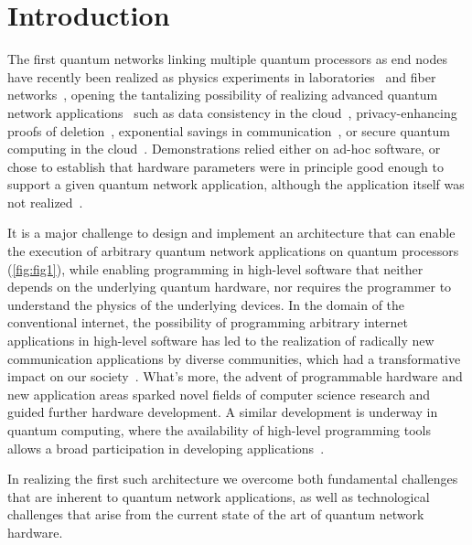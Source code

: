 \section{Introduction}

The first quantum networks linking multiple quantum processors as end nodes have recently been realized as physics experiments in laboratories~\cite{moehring_2007_ion_traps,ritter_2012_elementary,hofmann_2012_heralded,stockill_2017_phasetuned,jing2019entanglement,stephenson_2020_highrate,pompili_2021_multinode,krutyanskiy_entanglement_2023} and fiber networks~\cite{liu2024creation,stolk2024metropolitan,knaut2024entanglement}, opening the tantalizing possibility of realizing advanced quantum network applications~\cite{wehner_2018_stages} such as data consistency in the cloud~\cite{benor_2005_byzantine}, privacy-enhancing proofs of deletion~\cite{poremba_quantum_2022}, exponential savings in communication~\cite{guerin_exponential_2016}, or secure quantum computing in the cloud~\cite{broadbent_2009_ubqc,childs_2005_secure_qc}. Demonstrations relied either on ad-hoc software, or chose to establish that hardware parameters were in principle good enough to support a given quantum network application, although the application itself was not realized~\cite{nadlinger_device-independent_2022,liu_2022_photonic_diqkd,zhang_2022_diqkd}.

It is a major challenge to design and implement an architecture that can enable the execution of arbitrary quantum network applications on quantum processors (\cref{fig:fig1}), while enabling programming in high-level software that neither depends on the underlying quantum hardware, nor requires the programmer to understand the physics of the underlying devices.  In the domain of the conventional internet, the possibility of programming arbitrary internet applications in high-level software has led to the realization of radically new communication applications by diverse communities, which had a transformative impact on our society~\cite{castells_impact_2013}. What's more, the advent of programmable hardware and new application areas sparked novel fields of computer science research and guided further hardware development.  A similar development is underway in quantum computing, where the availability of high-level programming tools allows a broad participation in developing applications~\cite{noauthor_quantum_2024}.

In realizing the first such architecture we overcome both fundamental challenges that are inherent to quantum network applications, as well as technological challenges that arise from the current state of the art of quantum network hardware.

